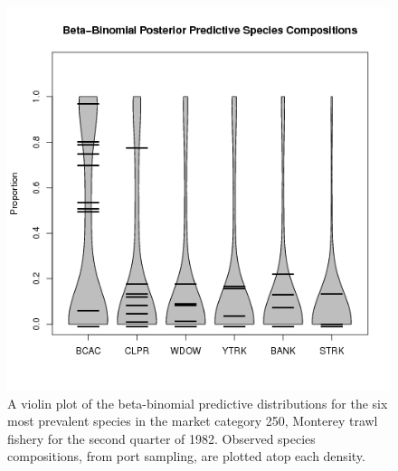 \documentclass[12pt]{article}
\begin{document}
\begin{figure}[h!]
\centering
\includegraphics{./pictures/compVioplotQtr2.png}
\caption{ A violin plot of the beta-binomial predictive distributions 
for the six most prevalent species in the market category 250, Monterey trawl 
fishery for the second quarter of 1982. Observed species compositions, from 
port sampling, are plotted atop each density.
}
\label{violin}
\end{figure}

%
\clearpage
%
\end{document}
